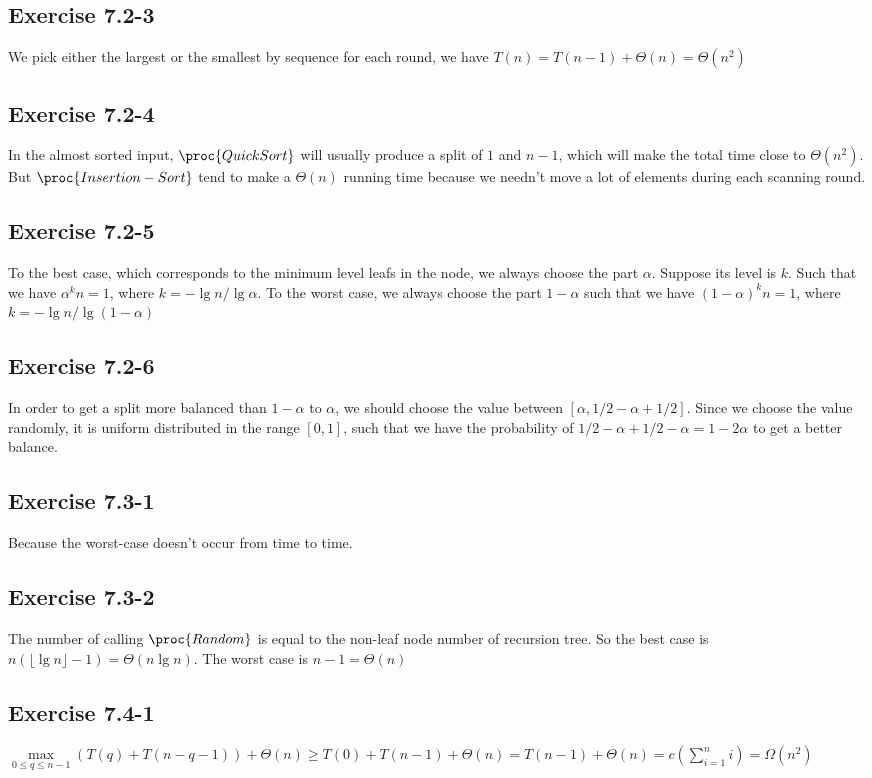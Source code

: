 \documentclass[12pt]{article}
\theoremstyle{definition}
\theoremstyle{remark}
\begin{document}
\subsection*{Exercise 7.2-3}
We pick either the largest or the smallest by sequence for each round, we have $T(n)=T(n-1)+\Theta(n)=\Theta(n^2)$
\subsection*{Exercise 7.2-4}
In the almost sorted input, $\proc{QuickSort}$ will usually produce a split of $1$ and $n-1$, which will make the total time close to $\Theta(n^2)$. But $\proc{Insertion-Sort}$ tend to make a $\Theta(n)$ running time because we needn't move a lot of elements during each scanning round.
\subsection*{Exercise 7.2-5}
To the best case, which corresponds to the minimum level leafs in the node, we always choose the part $\alpha$. Suppose its level is $k$. Such that we have $\alpha^kn=1$, where $k=-\lg{n}/\lg{\alpha}$. To the worst case, we always choose the part $1-\alpha$ such that we have $(1-\alpha)^kn=1$, where $k=-\lg{n}/\lg(1-\alpha)$
\subsection*{Exercise 7.2-6}
In order to get a split more balanced than $1-\alpha$ to $\alpha$, we should choose the value between $[\alpha,1/2-\alpha+1/2]$. Since we choose the value randomly, it is uniform distributed in the range $[0,1]$, such that we have the probability of $1/2-\alpha+1/2-\alpha=1-2\alpha$ to get a better balance.
\subsection*{Exercise 7.3-1}
Because the worst-case doesn't occur from time to time.
\subsection*{Exercise 7.3-2}
The number of calling $\proc{Random}$ is equal to the non-leaf node number of recursion tree. So the best case is $n(\lfloor\lg{n}\rfloor-1)=\Theta(n\lg{n})$. The worst case is $n-1=\Theta(n)$
\subsection*{Exercise 7.4-1}
$\max\limits_{0\le q\le n-1}(T(q)+T(n-q-1))+\Theta(n)\ge T(0)+T(n-1)+\Theta(n)=T(n-1)+\Theta(n)=c(\sum_{i=1}^ni)=\Omega(n^2)$
\end{document}
